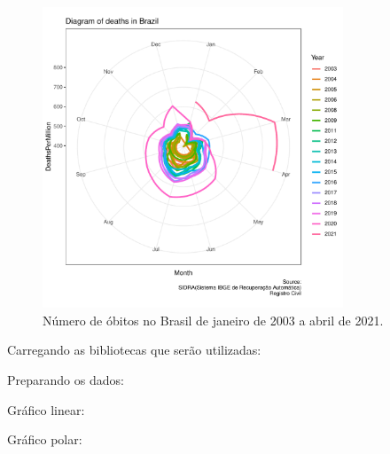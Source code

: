 \begin{frame}[allowframebreaks=1,fragile]
\begin{figure}[h]
 \centering
 \includegraphics[width=0.8\textwidth,height=0.75\textheight,keepaspectratio]{examples/deaths-brazil-polar-per1E6.pdf}
 \caption{\small Número de óbitos no Brasil de janeiro de 2003 a abril de 2021.}
 \label{fig-deathsbr-polar}
\end{figure}

\framebreak

Carregando as bibliotecas que serão utilizadas:


Preparando os dados:


\framebreak
Gráfico linear:


\framebreak
Gráfico polar:


\end{frame}



